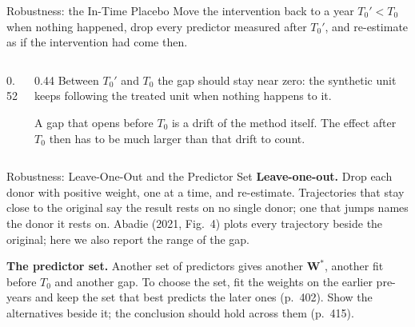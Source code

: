 \documentclass[main.tex]{subfiles}
\begin{document}
\begin{frame}{Robustness: the In-Time Placebo}
  \small
  Move the intervention back to a year $T_0' < T_0$ when nothing happened,
  drop every predictor measured after $T_0'$, and re-estimate as if the
  intervention had come then.
  \medskip
  \begin{columns}[T]
    \begin{column}{0.52\textwidth}
      \centering
    \end{column}
    \begin{column}{0.44\textwidth}
      \footnotesize
      Between $T_0'$ and $T_0$ the gap should stay near zero: the synthetic
      unit keeps following the treated unit when nothing happens to it.
      \medskip

      A gap that opens before $T_0$ is a drift of the method itself. The
      effect after $T_0$ then has to be much larger than that drift to
      count.
    \end{column}
  \end{columns}
\end{frame}
\begin{frame}{Robustness: Leave-One-Out and the Predictor Set}
  \small
  \textbf{Leave-one-out.} Drop each donor with positive weight, one at a time,
  and re-estimate. Trajectories that stay close to the original say the
  result rests on no single donor; one that jumps names the donor it rests on.
  Abadie (2021, Fig.~4) plots every trajectory beside the original; here we
  also report the range of the gap.
  \medskip

  \textbf{The predictor set.} Another set of predictors gives another
  $\mathbf{W}^{*}$, another fit before $T_0$ and another gap. To choose the
  set, fit the weights on the earlier pre-years and keep the set that best
  predicts the later ones (p.~402). Show the alternatives beside it; the
  conclusion should hold across them (p.~415).
\end{frame}
\end{document}
